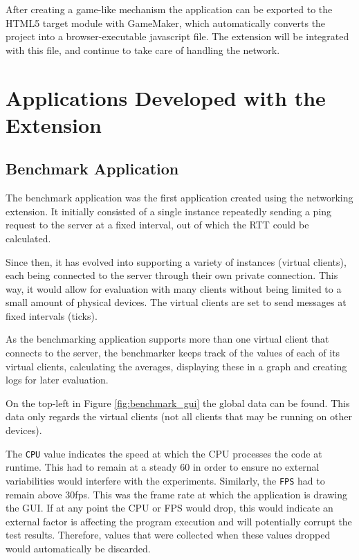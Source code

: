 \documentclass[bsc, 12pt, twoside, singlespacing, parskip, abbrevs, notimes, normalheadings, logo]{styles/infthesis}
\begin{document}
After creating a game-like mechanism the application can be exported to the HTML5 target module with GameMaker, which automatically converts the project into a browser-executable javascript file. The extension will be integrated with this file, and continue to take care of handling the network.

\section{Applications Developed with the Extension}
\subsection{Benchmark Application}
The benchmark application was the first application created using the networking extension. It initially consisted of a single instance repeatedly sending a ping request to the server at a fixed interval, out of which the RTT could be calculated.

Since then, it has evolved into supporting a variety of instances (virtual clients), each being connected to the server through their own private connection. This way, it would allow for evaluation with many clients without being limited to a small amount of physical devices. The virtual clients are set to send messages at fixed intervals (ticks).

As the benchmarking application supports more than one virtual client that connects to the server, the benchmarker keeps track of the values of each of its virtual clients, calculating the averages, displaying these in a graph and creating logs for later evaluation.

On the top-left in Figure \ref{fig:benchmark_gui} the global data can be found. This data only regards the virtual clients (not all clients that may be running on other devices). 

The \texttt{CPU} value indicates the speed at which the CPU processes the code at runtime. This had to remain at a steady 60 in order to ensure no external variabilities would interfere with the experiments. Similarly, the \texttt{FPS} had to remain above 30fps. This was the frame rate at which the application is drawing the GUI. If at any point the CPU or FPS would drop, this would indicate an external factor is affecting the program execution and will potentially corrupt the test results. Therefore, values that were collected when these values dropped would automatically be discarded.
\end{document}
